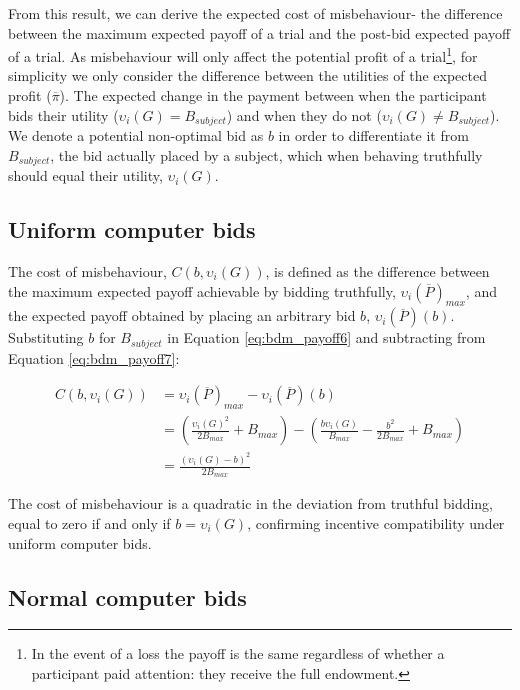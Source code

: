 From this result, we can derive the expected cost of misbehaviour- the difference between the maximum expected payoff of a trial and the post-bid expected payoff of a trial. As misbehaviour will only affect the potential profit of a trial\footnote{In the event of a loss the payoff is the same regardless of whether a participant paid attention: they receive the full endowment.}, for simplicity we only consider the difference between the utilities of the expected profit ($\overline{\pi}$). The expected change in the payment between when the participant bids their utility ($\upsilon_i (G) = B_{subject}$) and when they do not ($\upsilon_i (G) \neq B_{subject}$). We denote a potential non-optimal bid as $b$ in order to differentiate it from $B_{subject}$, the bid actually placed by a subject, which when behaving truthfully should equal their utility, $\upsilon_i(G)$.

\subsection*{Uniform computer bids}

The cost of misbehaviour, $C(b, \upsilon_i(G))$, is defined as the difference between the maximum expected payoff achievable by bidding truthfully, $\upsilon_i(\overline{P})_{max}$, and the expected payoff obtained by placing an arbitrary bid $b$, $\upsilon_i(\overline{P})(b)$. Substituting $b$ for $B_{subject}$ in Equation \ref{eq:bdm_payoff6} and subtracting from Equation \ref{eq:bdm_payoff7}:

\begin{equation}
\begin{aligned}
C(b, \upsilon_i(G)) &= \upsilon_i(\overline{P})_{max} - \upsilon_i(\overline{P})(b) \\
&= \left(\frac{\upsilon_i(G)^2}{2B_{max}} + B_{max}\right) - \left(\frac{b\upsilon_i(G)}{B_{max}} - \frac{b^2}{2B_{max}} + B_{max}\right) \\
&= \frac{(\upsilon_i(G) - b)^2}{2B_{max}}
\end{aligned}
\label{eq:cost_uniform}
\end{equation}

The cost of misbehaviour is a quadratic in the deviation from truthful bidding, equal to zero if and only if $b = \upsilon_i(G)$, confirming incentive compatibility under uniform computer bids.

\subsection*{Normal computer bids}

